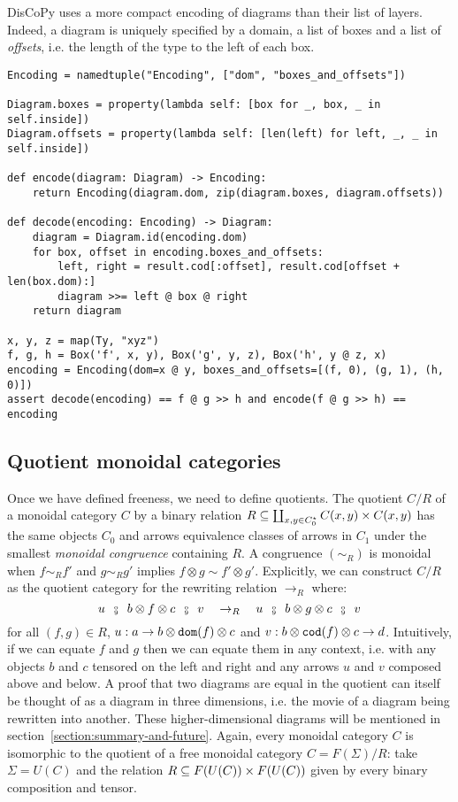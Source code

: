 \begin{remark}
DisCoPy uses a more compact encoding of diagrams than their list of layers.
Indeed, a diagram is uniquely specified by a domain, a list of boxes and a list of \emph{offsets}, i.e. the length of the type to the left of each box.

\begin{verbatim}
Encoding = namedtuple("Encoding", ["dom", "boxes_and_offsets"])

Diagram.boxes = property(lambda self: [box for _, box, _ in self.inside])
Diagram.offsets = property(lambda self: [len(left) for left, _, _ in self.inside])

def encode(diagram: Diagram) -> Encoding:
    return Encoding(diagram.dom, zip(diagram.boxes, diagram.offsets))

def decode(encoding: Encoding) -> Diagram:
    diagram = Diagram.id(encoding.dom)
    for box, offset in encoding.boxes_and_offsets:
        left, right = result.cod[:offset], result.cod[offset + len(box.dom):]
        diagram >>= left @ box @ right
    return diagram

x, y, z = map(Ty, "xyz")
f, g, h = Box('f', x, y), Box('g', y, z), Box('h', y @ z, x)
encoding = Encoding(dom=x @ y, boxes_and_offsets=[(f, 0), (g, 1), (h, 0)])
assert decode(encoding) == f @ g >> h and encode(f @ g >> h) == encoding
\end{verbatim}
\end{remark}

\subsection{Quotient monoidal categories}\label{subsection:quotient-monoidal}

Once we have defined freeness, we need to define quotients.
The quotient $C / R$ of a monoidal category $C$ by a binary relation $R \subseteq \coprod_{x, y \in C_0^\star} C(x, y) \times C(x, y)$ has the same objects $C_0$ and arrows equivalence classes of arrows in $C_1$ under the smallest \emph{monoidal congruence} containing $R$.
A congruence $(\sim_R)$ is monoidal when $f \sim_R f'$ and $g \sim_R g'$ implies $f \otimes g \sim f' \otimes g'$.
Explicitly, we can construct $C / R$ as the quotient category for the rewriting relation $\to_R$ where:
$$u \s \fcmp \s b \otimes f \otimes c \s \fcmp \s v \quad
\to_R \quad u \s \fcmp \s b \otimes g \otimes c \s \fcmp \s v$$
for all $(f, g) \in R$, $u : a \to b \otimes \mathtt{dom}(f) \otimes c$ and $v : b \otimes \mathtt{cod}(f) \otimes c \to d$.
Intuitively, if we can equate $f$ and $g$ then we can equate them in any context, i.e. with any objects $b$ and $c$ tensored on the left and right and any arrows $u$ and $v$ composed above and below.
A proof that two diagrams are equal in the quotient can itself be thought of as a diagram in three dimensions, i.e. the movie of a diagram being rewritten into another.
These higher-dimensional diagrams will be mentioned in section~\ref{section:summary-and-future}.
Again, every monoidal category $C$ is isomorphic to the quotient of a free monoidal category $C = F(\Sigma) / R$: take $\Sigma = U(C)$ and the relation $R \subseteq F(U(C)) \times F(U(C))$ given by every binary composition and tensor.

